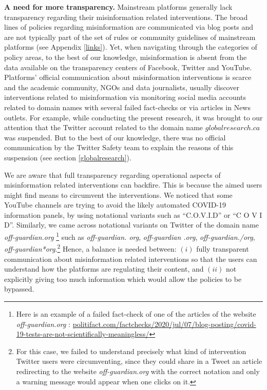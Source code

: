 \documentclass{article}
\begin{document}
\smallskip

{\bf A need for more transparency.} 
Mainstream platforms generally lack transparency regarding their misinformation related interventions.
The broad lines of policies regarding misinformation are communicated via blog posts and are not typically part of the set of rules or community guidelines of mainstream platforms (see Appendix \ref{links}).
Yet, when navigating through the categories of policy areas, to the best of our knowledge, misinformation is absent from the data available on the transparency centers of Facebook, Twitter and YouTube.
Platforms' official communication about misinformation interventions is scarce and the academic community, NGOs and data journalists, usually discover interventions related to misinformation via monitoring social media accounts related to domain names with several failed fact-checks or via articles in News outlets. 
For example, while conducting the present research, it was brought to our attention that the Twitter account related to the domain name $globalresearch.ca$ was suspended. 
But to the best of our knowledge, there was no official communication by the Twitter Safety team to explain the reasons of this suspension (see section \ref{globalresearch}). 

We are aware that full transparency regarding operational aspects of misinformation related interventions can backfire.
This is because the aimed users might find means to circumvent the interventions. 
We noticed that some YouTube channels are trying to avoid the likely automated COVID-19 information panels, by using notational variants such as ``C.O.V.I.D'' or ``C O V I D''. 
Similarly, we came across notational variants on Twitter of the domain name {\it off-guardian.org}
\footnote{Here is an example of a failed fact-check of one of the articles of the website {\it off-guardian.org} : \href{https://www.politifact.com/factchecks/2020/jul/07/blog-posting/covid-19-tests-are-not-scientifically-meaningless/}{politifact.com/factchecks/2020/jul/07/blog-posting/covid-19-tests-are-not-scientifically-meaningless/}}
such as {\it off-guardian. org}, {\it off-guardian .org}, {\it off-guardian./org}, {\it off-guardian*org}.\footnote{For this case, we failed to understand precisely what kind of intervention Twitter users were circumventing, since they could share in a Tweet an article redirecting to the website {\it off-guardian.org} with the correct notation and only a warning message would appear when one clicks on it.}
Hence, a balance is needed between: $(i)$ fully transparent communication about misinformation related interventions so that the users can understand how the platforms are regulating their content, and $(ii)$ not explicitly giving too much information which would allow the policies to be bypassed.
\end{document}
